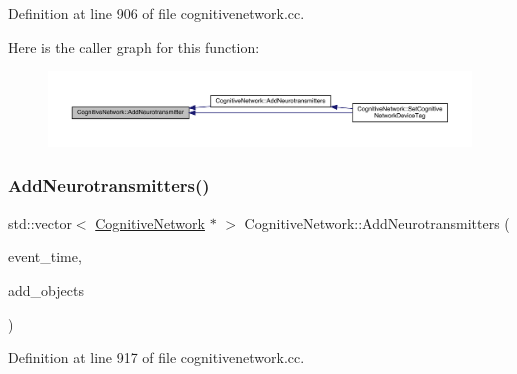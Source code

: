 Definition at line 906 of file cognitivenetwork.\+cc.

Here is the caller graph for this function\+:
\nopagebreak
\begin{figure}[H]
\begin{center}
\leavevmode
\includegraphics[width=350pt]{class_cognitive_network_ab80ffdc75ad4754463c356d36fb81ab4_icgraph}
\end{center}
\end{figure}
\mbox{\label{class_cognitive_network_a085f61ab94b71406a0a5e11d789ed69c}} 
\subsubsection{\texorpdfstring{Add\+Neurotransmitters()}{AddNeurotransmitters()}}
{\footnotesize\ttfamily std\+::vector$<$ \hyperlink{class_cognitive_network}{Cognitive\+Network} $\ast$ $>$ Cognitive\+Network\+::\+Add\+Neurotransmitters (\begin{DoxyParamCaption}\item[{std\+::chrono\+::time\+\_\+point$<$ \hyperlink{universe_8h_a0ef8d951d1ca5ab3cfaf7ab4c7a6fd80}{Clock} $>$}]{event\+\_\+time,  }\item[{std\+::vector$<$ \hyperlink{class_cognitive_network}{Cognitive\+Network} $\ast$$>$}]{add\+\_\+objects }\end{DoxyParamCaption})}



Definition at line 917 of file cognitivenetwork.\+cc.

